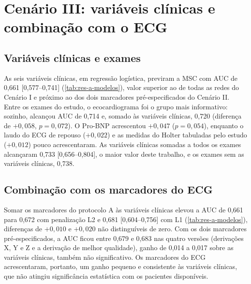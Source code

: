
\section{Cenário III: variáveis clínicas e combinação com o ECG}
\label{sec:res-cenario3}

\subsection{Variáveis clínicas e exames}
\label{subsec:res-clinicas}

As seis variáveis clínicas, em regressão logística, previram a \gls{MSC} com
\gls{AUC} de 0,661 [0,577--0,741] (\autoref{tab:res-a-modelos}), valor
superior ao de todas as redes do Cenário I e próximo ao dos dois marcadores
pré-especificados do Cenário II. Entre os exames do estudo, o ecocardiograma
foi o grupo mais informativo: sozinho, alcançou \gls{AUC} de 0,714 e, somado
às variáveis clínicas, 0,720 (diferença de $+0{,}058$, $p = 0{,}072$). O
Pro-BNP acrescentou $+0{,}047$ ($p = 0{,}054$), enquanto o laudo do
\gls{ECG} de repouso ($+0{,}022$) e as medidas do Holter tabuladas pelo
estudo ($+0{,}012$) pouco acrescentaram. As variáveis clínicas somadas a
todos os exames alcançaram 0,733 [0,656--0,804], o maior valor deste
trabalho, e os exames sem as variáveis clínicas, 0,738.

\subsection{Combinação com os marcadores do ECG}
\label{subsec:res-clinicas-marcadores}

Somar os marcadores do protocolo A às variáveis clínicas elevou a \gls{AUC}
de 0,661 para 0,672 com penalização L2 e 0,681 [0,604--0,756] com L1
(\autoref{tab:res-a-modelos}), diferenças de $+0{,}010$ e $+0{,}020$ não
distinguíveis de zero. Com os dois marcadores pré-especificados, a
\gls{AUC} ficou entre 0,679 e 0,683 nas quatro versões (derivações X, Y e Z
e a derivação de melhor qualidade), ganho de 0,014 a 0,017 sobre as
variáveis clínicas, também não significativo. Os marcadores do \gls{ECG}
acrescentaram, portanto, um ganho pequeno e consistente às variáveis
clínicas, que não atingiu significância estatística com os pacientes
disponíveis.

